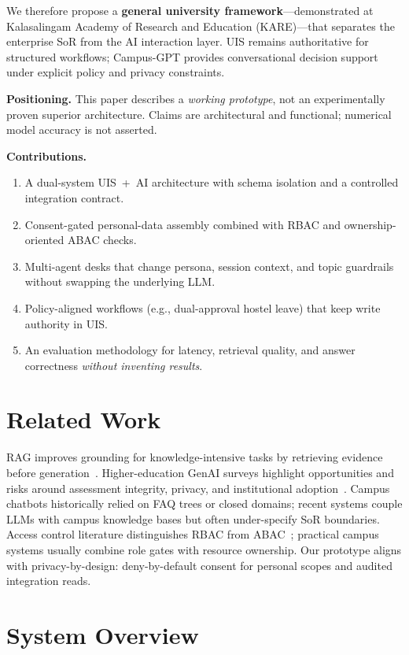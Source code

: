 \documentclass[conference]{IEEEtran}
\begin{document}
We therefore propose a \textbf{general university framework}---demonstrated at Kalasalingam Academy of Research and Education (KARE)---that separates the enterprise SoR from the AI interaction layer. UIS remains authoritative for structured workflows; Campus-GPT provides conversational decision support under explicit policy and privacy constraints.

\textbf{Positioning.} This paper describes a \emph{working prototype}, not an experimentally proven superior architecture. Claims are architectural and functional; numerical model accuracy is not asserted.

\textbf{Contributions.}
\begin{enumerate}[leftmargin=*,itemsep=1pt]
  \item A dual-system UIS~+~AI architecture with schema isolation and a controlled integration contract.
  \item Consent-gated personal-data assembly combined with RBAC and ownership-oriented ABAC checks.
  \item Multi-agent desks that change persona, session context, and topic guardrails without swapping the underlying LLM.
  \item Policy-aligned workflows (e.g., dual-approval hostel leave) that keep write authority in UIS.
  \item An evaluation methodology for latency, retrieval quality, and answer correctness \emph{without inventing results}.
\end{enumerate}

\section{Related Work}
RAG improves grounding for knowledge-intensive tasks by retrieving evidence before generation~\cite{lewis2020rag}. Higher-education GenAI surveys highlight opportunities and risks around assessment integrity, privacy, and institutional adoption~\cite{kasneci2023chatgpt,yan2024practical}. Campus chatbots historically relied on FAQ trees or closed domains; recent systems couple LLMs with campus knowledge bases but often under-specify SoR boundaries. Access control literature distinguishes RBAC from ABAC~\cite{hu2014guide}; practical campus systems usually combine role gates with resource ownership. Our prototype aligns with privacy-by-design: deny-by-default consent for personal scopes and audited integration reads.

\section{System Overview}
\end{document}
